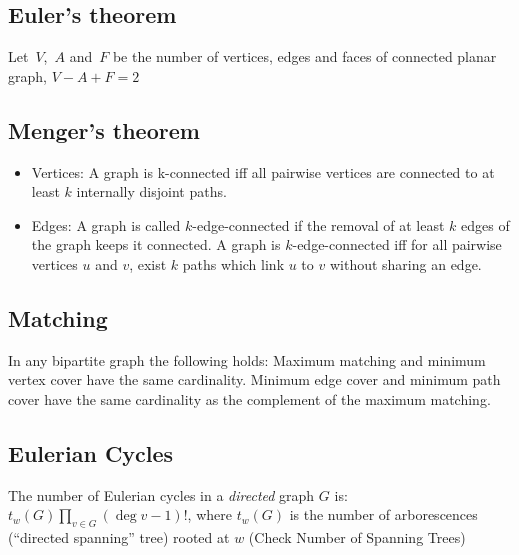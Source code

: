 \iffalse
\subsection{Landau}
There are a tournament with outdegree~$d_1 \leq d_2 \leq \ldots \leq d_n$ iff:
\begin{itemize}
\item $d_1 + d_2 + \ldots + d_n = \binom{n}{2}$

\item $d_1 + d_2 + \ldots + d_k \geq \binom{k}{2} \quad \forall 1 \leq k \leq n.$
\end{itemize}
In order to build, lets make~1 point to~$2, 3, \ldots, d_1 + 1$ and we follow recursively
\fi

\subsection{Euler's theorem}
Let~$V$,~$A$ and~$F$ be the number of vertices, edges and faces of connected planar graph, $V - A + F = 2$


\subsection{Menger's theorem}
\begin{itemize}
\item Vertices: A graph is k-connected iff all pairwise vertices 
	are connected to at least $k$ internally disjoint paths.

\item Edges: A graph is called $k$-edge-connected if the removal of at 
	least $k$ edges of the graph keeps it connected. A graph is 
	$k$-edge-connected iff for all pairwise vertices $u$ and $v$,  
	exist $k$ paths which link $u$ to $v$ without sharing an edge.
\end{itemize}
\subsection{Matching}
In any bipartite graph the following holds: Maximum matching and minimum vertex cover have the same cardinality.
Minimum edge cover and minimum path cover have the same cardinality as the complement of the maximum matching.

\subsection{Eulerian Cycles}
The number of Eulerian cycles in a \emph{directed} graph $G$ is: $t_w(G) \prod_{v \in G} (\deg v - 1)!$,
where $t_w(G)$ is the number of arborescences (``directed spanning'' tree) rooted at $w$
(Check Number of Spanning Trees)

